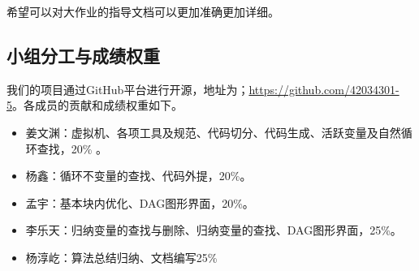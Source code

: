 \documentclass[cn,black,11pt,normal]{elegantnote}
\begin{document}
希望可以对大作业的指导文档可以更加准确更加详细。

\subsection{小组分工与成绩权重}

我们的项目通过GitHub平台进行开源，地址为；\url{https://github.com/42034301-5}。各成员的贡献和成绩权重如下。

\begin{itemize}
    \item 姜文渊：虚拟机、各项工具及规范、代码切分、代码生成、活跃变量及自然循环查找，20\% 。
    \item 杨鑫：循环不变量的查找、代码外提，20\%。
    \item 孟宇：基本块内优化、DAG图形界面，20\%。
    \item 李乐天：归纳变量的查找与删除、归纳变量的查找、DAG图形界面，25\%。
    \item 杨淳屹：算法总结归纳、文档编写25\%
\end{itemize}
\end{document}
